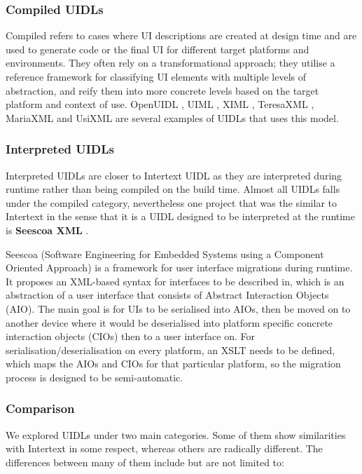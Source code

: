 \subsubsection{Compiled UIDLs}

Compiled refers to cases where UI descriptions are created at design time and are used to generate code or the final UI for different target platforms and environments. They often rely on a transformational approach; they utilise a reference framework for classifying UI elements with multiple levels of abstraction, and reify them into more concrete levels based on the target platform and context of use. OpenUIDL \cite{openuidl}, UIML \cite{UIML}, XIML \cite{XIML}, TeresaXML \cite{TeresaXML}, MariaXML \cite{MariaXML} and UsiXML \cite{UsiXML} are several examples of UIDLs that uses this model. 

\subsubsection{Interpreted UIDLs}

Interpreted UIDLs are closer to Intertext UIDL as they are interpreted during runtime rather than being compiled on the build time. Almost all UIDLs falls under the compiled category, nevertheless one project that was the similar to Intertext in the sense that it is a UIDL designed to be interpreted at the runtime is \textbf{Seescoa XML} \cite{seescoa}. 

Seescoa (Software Engineering for Embedded Systems using a Component Oriented Approach) is a framework for user interface migrations during runtime. It proposes an XML-based syntax for interfaces to be described in, which is an abstraction of a user interface that consists of Abstract Interaction Objects (AIO). The main goal is for UIs to be serialised into AIOs, then be moved on to another device where it would be deserialised into platform specific concrete interaction objects (CIOs) then to a user interface on. For serialisation/deserialisation on every platform, an XSLT needs to be defined, which maps the AIOs and CIOs for that particular platform, so the migration process is designed to be semi-automatic.

\subsubsection{Comparison}

We explored UIDLs under two main categories. Some of them show similarities with Intertext in some respect, whereas others are radically different. The differences between many of them include but are not limited to:

